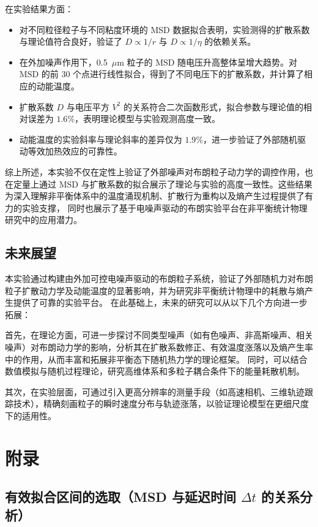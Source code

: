 \documentclass[a4paper]{report} %
\begin{document}
在实验结果方面：\par
\begin{itemize}
    \item 对不同粒径粒子与不同粘度环境的 MSD 数据拟合表明，实验测得的扩散系数与理论值符合良好，验证了 $D \propto 1/r$ 与 $D \propto 1/\eta$ 的依赖关系。
    \item 在外加噪声作用下，0.5~$\mu$m 粒子的 MSD 随电压升高整体呈增大趋势。对 MSD 的前 30 个点进行线性拟合，得到了不同电压下的扩散系数，并计算了相应的动能温度。
    \item 扩散系数 $D$ 与电压平方 $V^2$ 的关系符合二次函数形式，拟合参数与理论值的相对误差为 $1.6\%$，表明理论模型与实验观测高度一致。
    \item 动能温度的实验斜率与理论斜率的差异仅为 $1.9\%$，进一步验证了外部随机驱动等效加热效应的可靠性。
\end{itemize}

综上所述，本实验不仅在定性上验证了外部噪声对布朗粒子动力学的调控作用，也在定量上通过 MSD 与扩散系数的拟合展示了理论与实验的高度一致性。这些结果为深入理解非平衡体系中的温度涌现机制、扩散行为重构以及熵产生过程提供了有力的实验支撑，
同时也展示了基于电噪声驱动的布朗实验平台在非平衡统计物理研究中的应用潜力。

\section{未来展望}
本实验通过构建由外加可控电噪声驱动的布朗粒子系统，验证了外部随机力对布朗粒子扩散动力学及动能温度的显著影响，并为研究非平衡统计物理中的耗散与熵产生提供了可靠的实验平台。
在此基础上，未来的研究可以从以下几个方向进一步拓展：\par

首先，在理论方面，可进一步探讨不同类型噪声（如有色噪声、非高斯噪声、相关噪声）对布朗动力学的影响，分析其在扩散系数修正、有效温度涨落以及熵产生率中的作用，从而丰富和拓展非平衡态下随机热力学的理论框架。
同时，可以结合数值模拟与随机过程理论，研究高维体系和多粒子耦合条件下的能量耗散机制。\par

其次，在实验层面，可通过引入更高分辨率的测量手段（如高速相机、三维轨迹跟踪技术），精确刻画粒子的瞬时速度分布与轨迹涨落，以验证理论模型在更细尺度下的适用性。

\chapter{附录}
\section{有效拟合区间的选取（MSD 与延迟时间 $\Delta t$ 的关系分析）}
\end{document}
